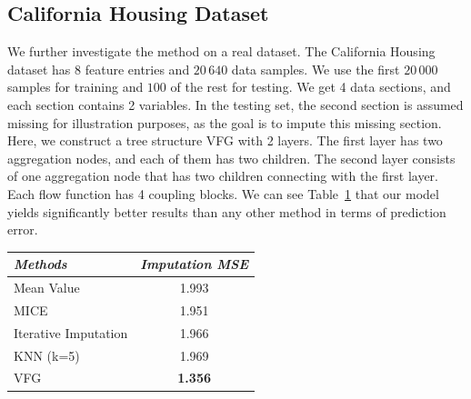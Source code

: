 \documentclass[twoside]{article}
\begin{document}
\subsection{California Housing Dataset}
We further investigate the method on a real dataset.  
The California Housing dataset  has 8 feature entries and $20\,640$ data samples. 
We use the first $20\,000$ samples for training  and $100$ of the rest for testing.  
We get  4 data sections, and each section contains 2 variables. 
In the testing set, the second section is assumed missing for illustration purposes, as the goal is to impute this missing section.
Here, we construct a tree structure VFG with 2 layers. 
The first layer has two aggregation nodes, and each of them has two children. 
The second layer consists of one aggregation node that has two children connecting with the first layer.  
Each flow function has 4 coupling blocks. 
We can see Table~\ref{tab:imp_arrhytmia} that our model yields significantly better results than any other method in terms of prediction error. 
\begin{table}[ht]
\centering
 \begin{tabular}{l | c  }\hline
\textit{Methods} & \textit{Imputation MSE}  \\
\hline
Mean Value &1.993 \\
MICE & 1.951\\
Iterative Imputation & 1.966\\
KNN (k=5) &1.969 \\
\hline
VFG & \textbf{1.356} \\  
\hline
\end{tabular}
 \label{tab:imp_arrhytmia}
\end{table}


\end{document}
